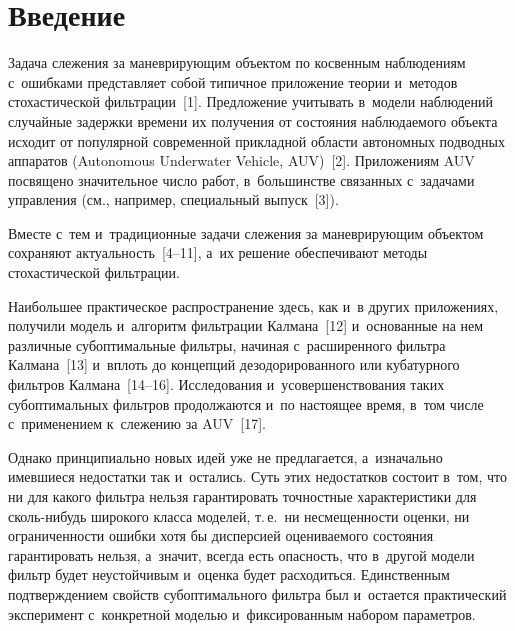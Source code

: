 
  



\thispagestyle{headings}

\begin{multicols}{2}

\label{st\stat}

\section{Введение}

     Задача слежения за маневрирующим объектом по косвенным 
наблюдениям с~ошибками пред\-став\-ля\-ет собой типичное приложение 
тео\-рии и~методов сто\-ха\-сти\-че\-ской фильт\-ра\-ции~[1]. Предложение учитывать в~модели 
наблюдений случайные за\-держ\-ки времени их получения от со\-сто\-яния 
наблюдаемого объекта исходит от популярной современной при\-клад\-ной 
об\-ласти автономных подводных аппаратов (Autonomous Underwater Vehicle, 
AUV)~[2]. Приложениям AUV посвящено значительное чис\-ло работ, в~большинстве 
связанных с~задачами управ\-ле\-ния (см., например, специальный 
выпуск~[3]). 

Вмес\-те с~тем и~традиционные задачи слежения за 
ма\-нев\-ри\-ру\-ющим объектом сохраняют ак\-ту\-аль\-ность~[4--11], а~их решение 
обеспечивают методы сто\-ха\-сти\-че\-ской фильт\-ра\-ции. 

Наибольшее 
практическое рас\-про\-стра\-не\-ние здесь, как и~в других приложениях, получили 
модель и~алгоритм фильт\-ра\-ции Калмана~[12] и~основанные на нем 
различные субоптимальные фильт\-ры, начиная с~расширенного фильт\-ра 
Калмана~[13] и~\mbox{вплоть} до концепций дезодорированного или кубатурного 
фильт\-ров Калмана~[14--16]. Исследования и~усовершенствования таких 
субоптимальных фильт\-ров продолжаются и~по на\-сто\-ящее время, в~том чис\-ле 
с~применением к~слежению за AUV~[17]. 

Однако принципиально новых 
идей уже не предлагается, а~изначально имев\-ши\-еся недостатки так 
и~остались. Суть этих недостатков со\-сто\-ит в~том, что ни для какого фильт\-ра 
нельзя гарантировать точ\-ност\-ные характеристики для сколь-ни\-будь 
широкого класса моделей, т.\,е.\ ни несмещенности оценки, ни 
ограниченности ошиб\-ки хотя бы дис\-пер\-си\-ей оце\-ни\-ва\-емо\-го со\-сто\-яния 
гарантировать нельзя, а~значит, всегда есть опас\-ность, что в~другой модели 
фильтр будет неустойчивым и~оценка будет расходиться. Единственным 
под\-тверж\-де\-ни\-ем свойств субоптимального фильт\-ра был и~остается 
практический эксперимент с~конкретной мо\-делью и~фиксированным набором 
па\-ра\-мет\-ров.
     

\end{multicols}
